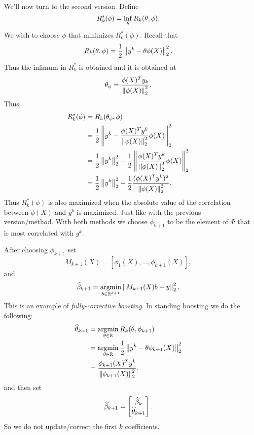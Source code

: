 We'll now turn to the second version. Define
\[R^*_k(\phi) = \inf_{\theta} R_k({\theta},\phi). \]
We wish to choose $\phi$ that minimizes $R^*_k(\phi)$. Recall that
\[R_k({\theta},\phi) = \frac{1}{2}\left\|y^k - {\theta} \phi(X)\right\|_2^2.\]
Thus the infimum in $R^*_k$ is obtained and it is obtained at 
\[ {\theta}_\phi = \frac{\phi(X)^T y_k}{\left\|\phi(X)\right\|_2^2}.\]
Thus 
\begin{align*}
    R^*_k(\phi) &= R_k({\theta}_\phi,\phi)\\
    &= \frac{1}{2}\left\|y^k - \frac{\phi(X)^Ty^k}{\left\|\phi(X)\right\|^2_2}\phi(X)\right\|_2^2\\
    &= \frac{1}{2}\left\|y^k\right\|_2^2 - \frac{1}{2}\left\|\frac{\phi(X)^Ty^k}{\left\|\phi(X)\right\|^2_2}\phi(X)\right\|_2^2\\
    &=\frac{1}{2}\left\|y^k\right\|_2^2 - \frac{1}{2}\frac{(\phi(X)^T y^k)^2}{\left\|\phi(X)\right\|_2^2}.
\end{align*}
Thus $R^*_k(\phi)$ is also maximized when the absolute value of the correlation between $\phi(X)$ and $y^k$ is maximized. Just like with the previous version/method. With both methods we choose $\phi_{k+1}$ to be the element of $\Phi$ that is most correlated with $y^k$.

After  choosing $\phi_{k+1}$ set 
\[M_{k+1}(X) = [\phi_1(X),\ldots, \phi_{k+1}(X)],\]
and
\[\widehat{\beta}_{k+1} = \operatorname*{argmin}_{b \in {\mathbb R}^{k+1}}\left\|M_{k+1}(X)b-y\right\|_2^2.\]
This is an example of \emph{fully-corrective boosting}. In standing boosting we do the following:
\begin{align*}
    \widehat{{\theta}}_{k+1} &= \operatorname*{argmin}_{{\theta} \in {\mathbb R}}R_k({\theta},\phi_{k+1})\\
    &= \operatorname*{argmin}_{{\theta} \in {\mathbb R}}\frac{1}{2}\left\|y^k - {\theta} \phi_{k+1}(X)\right\|_2^2\\
    &= \frac{\phi_{k+1}(X)^T y^k}{\left\|\phi_{k+1}(X)\right\|_2^2},
\end{align*}
and then set 
\[ \widehat{\beta}_{k+1} = \begin{bmatrix}
    \widehat{\beta}_k \\ \widehat{{\theta}}_{k+1}
\end{bmatrix}.\]
So we do not update/correct the first $k$ coefficients.
